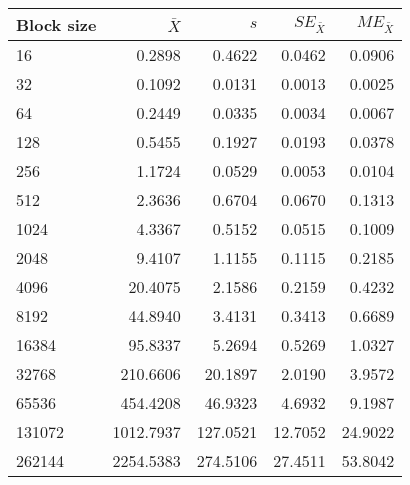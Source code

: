 \begin{tabular}{lrrrr}\toprule
{\small Block size} & $\bar{X}$ & $s$ & $SE_{\bar{X}}$ & $ME_{\bar{X}}$ \\\midrule
16 & 0.2898 & 0.4622 & 0.0462 & 0.0906\\
32 & 0.1092 & 0.0131 & 0.0013 & 0.0025\\
64 & 0.2449 & 0.0335 & 0.0034 & 0.0067\\
128 & 0.5455 & 0.1927 & 0.0193 & 0.0378\\
256 & 1.1724 & 0.0529 & 0.0053 & 0.0104\\
512 & 2.3636 & 0.6704 & 0.0670 & 0.1313\\
1024 & 4.3367 & 0.5152 & 0.0515 & 0.1009\\
2048 & 9.4107 & 1.1155 & 0.1115 & 0.2185\\
4096 & 20.4075 & 2.1586 & 0.2159 & 0.4232\\
8192 & 44.8940 & 3.4131 & 0.3413 & 0.6689\\
16384 & 95.8337 & 5.2694 & 0.5269 & 1.0327\\
32768 & 210.6606 & 20.1897 & 2.0190 & 3.9572\\
65536 & 454.4208 & 46.9323 & 4.6932 & 9.1987\\
131072 & 1012.7937 & 127.0521 & 12.7052 & 24.9022\\
262144 & 2254.5383 & 274.5106 & 27.4511 & 53.8042\\
\bottomrule
\end{tabular}
